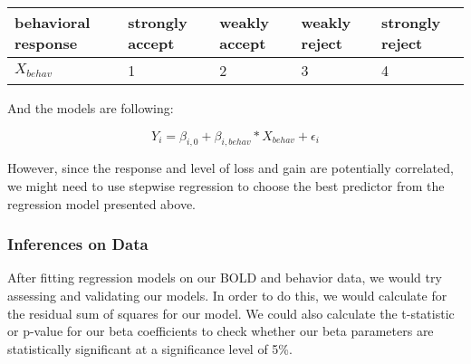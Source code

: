 \begin{tabular}{lllll}
\hline
behavioral response & strongly accept & weakly accept & weakly reject & strongly reject\\ 
\hline
$X_{behav}$ & 1 & 2 & 3 & 4 \\
\hline
\end{tabular}

And the models are following:

\begin{equation}
Y_{i} = \beta_{i, 0} + \beta_{i, behav} * X_{behav} + \epsilon_i
\end{equation}

However, since the response and level of loss and gain are potentially correlated, we might need to use stepwise regression to choose the best predictor from the regression model presented above.

\subsubsection{Inferences on Data}
\indent \indent After fitting regression models on our BOLD and behavior data, we would try assessing and validating our models. In order to do this, we would calculate for the residual sum of squares for our model. We could also calculate the t-statistic or p-value for our beta coefficients to check whether our beta parameters are statistically significant at a significance level of 5\%.
